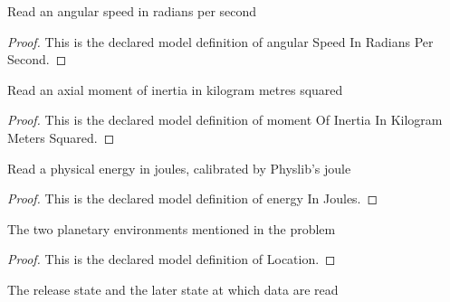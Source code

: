 \begin{definition}
  \label{def:physics:phyx-mini-0773:phyxminiproblems-problemphyxmini0773-angularspeedinradianspersecond}
  Read an angular speed in radians per second
\end{definition}
\begin{proof}
  This is the declared model definition of angular Speed In Radians Per Second.
\end{proof}
\begin{definition}
  \label{def:physics:phyx-mini-0773:phyxminiproblems-problemphyxmini0773-momentofinertiainkilogrammeterssquared}
  Read an axial moment of inertia in kilogram metres squared
\end{definition}
\begin{proof}
  This is the declared model definition of moment Of Inertia In Kilogram Meters Squared.
\end{proof}
\begin{definition}
  \label{def:physics:phyx-mini-0773:phyxminiproblems-problemphyxmini0773-energyinjoules}
  Read a physical energy in joules, calibrated by Physlib's joule
\end{definition}
\begin{proof}
  This is the declared model definition of energy In Joules.
\end{proof}
\begin{definition}[Location]
  \label{def:physics:phyx-mini-0773:phyxminiproblems-problemphyxmini0773-location}
  The two planetary environments mentioned in the problem
\end{definition}
\begin{proof}
  This is the declared model definition of Location.
\end{proof}
\begin{definition}
  \label{def:physics:phyx-mini-0773:phyxminiproblems-problemphyxmini0773-motionstage}
  The release state and the later state at which data are read
\end{definition}
